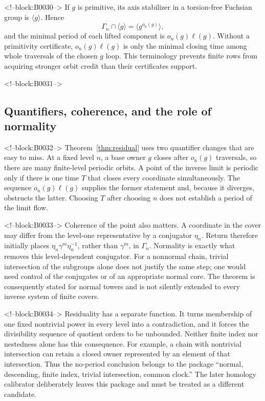 \documentclass[11pt]{article}
\theoremstyle{definition}
\theoremstyle{remark}
\begin{document}
<!--block:B0030-->
If $g$ is primitive, its axis stabilizer in a torsion-free Fuchsian group is $\langle g\rangle$. Hence
\[
\Gamma_n\cap\langle g\rangle=\langle g^{o_n(g)}\rangle,
\]
and the minimal period of each lifted component is $o_n(g)\ell(g)$. Without a primitivity certificate, $o_n(g)\ell(g)$ is only the minimal closing time among whole traversals of the chosen $g$ loop. This terminology prevents finite rows from acquiring stronger orbit credit than their certificates support.

<!--block:B0031-->
\subsection{Quantifiers, coherence, and the role of normality}

<!--block:B0032-->
Theorem~\ref{thm:residual} uses two quantifier changes that are easy to miss. At a fixed level $n$, a base owner $g$ closes after $o_n(g)$ traversals, so there are many finite-level periodic orbits. A point of the inverse limit is periodic only if there is one time $T$ that closes every coordinate simultaneously. The sequence $o_n(g)\ell(g)$ supplies the former statement and, because it diverges, obstructs the latter. Choosing $T$ after choosing $n$ does not establish a period of the limit flow.

<!--block:B0033-->
Coherence of the point also matters. A coordinate in the cover may differ from the level-one representative by a conjugator $\eta_n$. Return therefore initially places $\eta_n\gamma^m\eta_n^{-1}$, rather than $\gamma^m$, in $\Gamma_n$. Normality is exactly what removes this level-dependent conjugator. For a nonnormal chain, trivial intersection of the subgroups alone does not justify the same step; one would need control of the conjugates or of an appropriate normal core. The theorem is consequently stated for normal towers and is not silently extended to every inverse system of finite covers.

<!--block:B0034-->
Residuality has a separate function. It turns membership of one fixed nontrivial power in every level into a contradiction, and it forces the divisibility sequence of quotient orders to be unbounded. Neither finite index nor nestedness alone has this consequence. For example, a chain with nontrivial intersection can retain a closed owner represented by an element of that intersection. Thus the no-period conclusion belongs to the package ``normal, descending, finite index, trivial intersection, common clock.'' The later homology calibrator deliberately leaves this package and must be treated as a different candidate.
\end{document}
